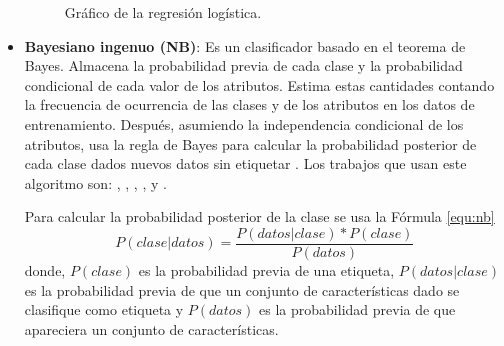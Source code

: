\begin{itemize}
\begin{figure}[h!]
\begin{center}
{}
\end{center}
\caption{Gráfico de la regresión logística.}
\label{fig:logistic}
\end{figure}


\item \textbf{Bayesiano ingenuo (\gls{NB})}: Es un clasificador basado en el teorema de Bayes. Almacena la probabilidad previa de cada clase y la probabilidad condicional de cada valor de los atributos. Estima estas cantidades contando la frecuencia de ocurrencia de las clases y de los atributos en los datos de entrenamiento. Después, asumiendo la independencia condicional de los atributos, usa la regla de Bayes para calcular la probabilidad posterior de cada clase dados nuevos datos sin etiquetar \cite{134}. Los trabajos que usan este algoritmo son: \cite{elderan}, \cite{flow}, \cite{shallow}, \cite{rwguard}, \cite{detecting} y \cite{Kok2019}.

Para calcular la probabilidad posterior de la clase se usa la Fórmula \ref{equ:nb} \cite{131}
\begin{equation}\label{equ:nb}
P (clase | datos) = \frac{P (datos | clase)*P (clase)}{P (datos)}
\end{equation}
\noindent donde, $P(clase)$ es la probabilidad previa de una etiqueta, $P(datos | clase)$ es la probabilidad previa de que un conjunto de características dado se clasifique como etiqueta y $P(datos)$ es la probabilidad previa de que apareciera un conjunto de características.



\end{itemize}
